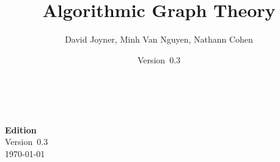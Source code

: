 \documentclass[a4paper,twoside,12pt]{book}
\newcommand{\documentEdition}{0.3}
\begin{document}
\title{\Huge{\bf{Algorithmic Graph Theory}}}
\author{\Large{David Joyner, Minh Van Nguyen, Nathann Cohen}}
\date{Version~\documentEdition}
\maketitle



{\thispagestyle{empty}
   \\\\
  \textbf{Edition} \\
  Version~\documentEdition \\
  \today
}

\frontmatter
\setcounter{tocdepth}{1}
\tableofcontents

\listofalgorithms
{}
\listoffigures
{}
\listoftables
{}

\mainmatter














\appendix



\backmatter


\printindex
\end{document}
